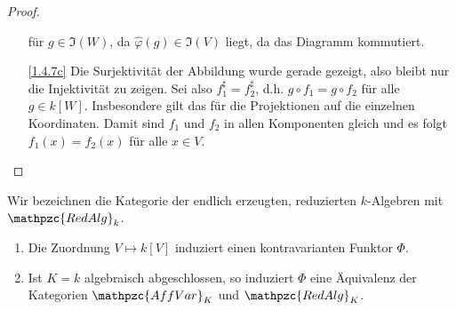 \documentclass[a4paper,12pt,index=toc]{scrbook}
\theoremstyle{keinenummern} %
\def\I{\mathfrak{I}}
\newcommand{\AffVar}{\mathpzc{AffVar}}
\newcommand{\RedAlg}{\mathpzc{RedAlg}}
\renewcommand{\phi}{\varphi}
\newcommand{\dach}{\widehat}
\begin{document}
\begin{proof}
\begin{enumerate}
für $g \in \I(W)$, da $\dach{\phi}(g)\in\I(V)$ liegt, da das Diagramm kommutiert.
\item[\ref{1.4.7c}] Die Surjektivität der Abbildung wurde gerade gezeigt, also bleibt nur die Injektivität zu zeigen.
Sei also $f_1^{\sharp}=f_2^{\sharp}$, d.h. $g\circ f_1=g\circ f_2$ für alle $g\in k[W]$.
Insbesondere gilt das für die Projektionen auf die einzelnen Koordinaten. Damit sind $f_{1}$ und $f_{2}$ in allen Komponenten gleich und es folgt $f_1(x)=f_2(x)$ für alle $x\in V$. 
\end{enumerate}
\end{proof}

\begin{satz}\label{satz3} Wir bezeichnen die Kategorie der endlich erzeugten, reduzierten $k$-Algebren mit $\RedAlg_k$.
\begin{enumerate}
\item{} Die Zuordnung $V\mapsto k[V]$ induziert einen kontravarianten Funktor $\Phi$.
\item{} Ist $K=k$ algebraisch abgeschlossen, so induziert $\Phi$ eine Äquivalenz der Kategorien $\AffVar_K$ und $\RedAlg_K$.
\end{enumerate}
\end{satz}
\end{document}
